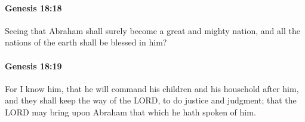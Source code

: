 		\paragraph{Genesis 18:18} %
			\label{GENESIS-18-18}

			Seeing that Abraham shall surely become a great and mighty nation, and all the nations of the earth shall be blessed in him?


		\paragraph{Genesis 18:19} %
			\label{GENESIS-18-19}

			For I know him, that he will command his children and his household after him, and they shall keep the way of the LORD, to do justice and judgment; that the LORD may bring upon Abraham that which he hath spoken of him.


